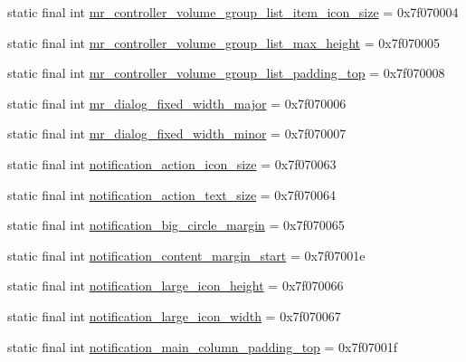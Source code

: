 \begin{CompactItemize}
\item 
static final int \hyperlink{classandroid_1_1support_1_1mediacompat_1_1_r_1_1dimen_fded75315537fd81e3195b3a894453ff}{mr\_\-controller\_\-volume\_\-group\_\-list\_\-item\_\-icon\_\-size} = 0x7f070004
\item 
static final int \hyperlink{classandroid_1_1support_1_1mediacompat_1_1_r_1_1dimen_86be261ec21652ac7645248385aebb4a}{mr\_\-controller\_\-volume\_\-group\_\-list\_\-max\_\-height} = 0x7f070005
\item 
static final int \hyperlink{classandroid_1_1support_1_1mediacompat_1_1_r_1_1dimen_ea41ed8c4b183de6ccc96c8f3ed0878a}{mr\_\-controller\_\-volume\_\-group\_\-list\_\-padding\_\-top} = 0x7f070008
\item 
static final int \hyperlink{classandroid_1_1support_1_1mediacompat_1_1_r_1_1dimen_aac4c67ed4fd693ae10ac1e40bef8b22}{mr\_\-dialog\_\-fixed\_\-width\_\-major} = 0x7f070006
\item 
static final int \hyperlink{classandroid_1_1support_1_1mediacompat_1_1_r_1_1dimen_daecac5c13f3a26e9372ad5f6cbef98d}{mr\_\-dialog\_\-fixed\_\-width\_\-minor} = 0x7f070007
\item 
static final int \hyperlink{classandroid_1_1support_1_1mediacompat_1_1_r_1_1dimen_f5b8b65cd1b8de5bdc381b85f430aaf0}{notification\_\-action\_\-icon\_\-size} = 0x7f070063
\item 
static final int \hyperlink{classandroid_1_1support_1_1mediacompat_1_1_r_1_1dimen_22fe71c698a43efa82296cae7134ca7e}{notification\_\-action\_\-text\_\-size} = 0x7f070064
\item 
static final int \hyperlink{classandroid_1_1support_1_1mediacompat_1_1_r_1_1dimen_85ee9d031975249dc0bcd667fcd4478c}{notification\_\-big\_\-circle\_\-margin} = 0x7f070065
\item 
static final int \hyperlink{classandroid_1_1support_1_1mediacompat_1_1_r_1_1dimen_947d4446a18bdf9c124e3a9f61e00ef0}{notification\_\-content\_\-margin\_\-start} = 0x7f07001e
\item 
static final int \hyperlink{classandroid_1_1support_1_1mediacompat_1_1_r_1_1dimen_546166a5e12794ab42ec05de7c0456fd}{notification\_\-large\_\-icon\_\-height} = 0x7f070066
\item 
static final int \hyperlink{classandroid_1_1support_1_1mediacompat_1_1_r_1_1dimen_c642db2e6659442fe787d2f43e2a5b9d}{notification\_\-large\_\-icon\_\-width} = 0x7f070067
\item 
static final int \hyperlink{classandroid_1_1support_1_1mediacompat_1_1_r_1_1dimen_f8ed2142927164f77fe706de3ac8cda6}{notification\_\-main\_\-column\_\-padding\_\-top} = 0x7f07001f

\end{CompactItemize}
